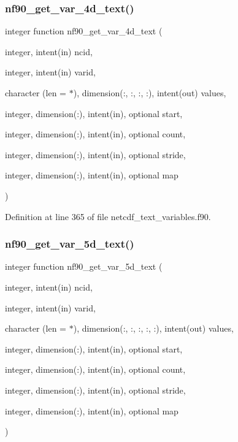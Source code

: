 \subsubsection{\texorpdfstring{nf90\+\_\+get\+\_\+var\+\_\+4d\+\_\+text()}{nf90\_get\_var\_4d\_text()}}
{\footnotesize\ttfamily integer function nf90\+\_\+get\+\_\+var\+\_\+4d\+\_\+text (\begin{DoxyParamCaption}\item[{integer, intent(in)}]{ncid,  }\item[{integer, intent(in)}]{varid,  }\item[{character (len = $\ast$), dimension(\+:, \+:, \+:, \+:), intent(out)}]{values,  }\item[{integer, dimension(\+:), intent(in), optional}]{start,  }\item[{integer, dimension(\+:), intent(in), optional}]{count,  }\item[{integer, dimension(\+:), intent(in), optional}]{stride,  }\item[{integer, dimension(\+:), intent(in), optional}]{map }\end{DoxyParamCaption})}



Definition at line 365 of file netcdf\+\_\+text\+\_\+variables.\+f90.

\mbox{\label{netcdf__text__variables_8f90_a2a34081d2ab49f288ff045399e59e0e3}} 
\subsubsection{\texorpdfstring{nf90\+\_\+get\+\_\+var\+\_\+5d\+\_\+text()}{nf90\_get\_var\_5d\_text()}}
{\footnotesize\ttfamily integer function nf90\+\_\+get\+\_\+var\+\_\+5d\+\_\+text (\begin{DoxyParamCaption}\item[{integer, intent(in)}]{ncid,  }\item[{integer, intent(in)}]{varid,  }\item[{character (len = $\ast$), dimension(\+:, \+:, \+:, \+:, \+:), intent(out)}]{values,  }\item[{integer, dimension(\+:), intent(in), optional}]{start,  }\item[{integer, dimension(\+:), intent(in), optional}]{count,  }\item[{integer, dimension(\+:), intent(in), optional}]{stride,  }\item[{integer, dimension(\+:), intent(in), optional}]{map }\end{DoxyParamCaption})}



